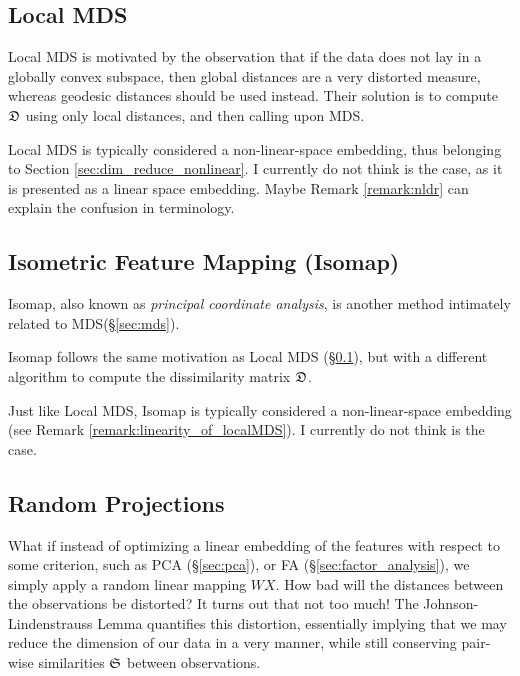 \subsection{Local MDS}
\label{sec:localMDS}
Local MDS is motivated by the observation that if the data does not lay in a globally convex subspace, then global distances are a very distorted measure, whereas geodesic distances should be used instead. 
Their solution is to compute $\mathfrak{D}$ using only local distances, and then calling upon MDS.

\begin{remark}
\label{remark:linearity_of_localMDS}
Local MDS is typically considered a non-linear-space embedding, thus belonging to Section \ref{sec:dim_reduce_nonlinear}.
I currently do not think is the case, as it is presented as a linear space embedding.
Maybe Remark \ref{remark:nldr} can explain the confusion in terminology.
\end{remark}



\subsection{Isometric Feature Mapping (Isomap)}
\label{sec:isomap}

Isomap, also known as \emph{principal coordinate analysis}, is another method intimately related to MDS(\S\ref{sec:mds}).

Isomap follows the same motivation as Local MDS (\S\ref{sec:localMDS}), but with a different algorithm to compute the dissimilarity matrix $\mathfrak{D}$.

\begin{remark}
Just like Local MDS, Isomap is typically considered a non-linear-space embedding (see Remark \ref{remark:linearity_of_localMDS}).
I currently do not think is the case.
\end{remark}



\subsection{Random Projections}
\label{sec:random_projections}

What if instead of optimizing a linear embedding of the features with respect to some criterion, such as PCA (\S\ref{sec:pca}), or FA (\S\ref{sec:factor_analysis}), we simply apply a random linear mapping $W X$. How bad will the distances between the observations be distorted? 
It turns out that not too much!
The Johnson-Lindenstrauss Lemma \citep{johnson_extensions_1984} quantifies this distortion, essentially implying that we may reduce the dimension of our data in a very \naive manner, while still conserving pair-wise similarities $\mathfrak{S}$ between observations.
 








